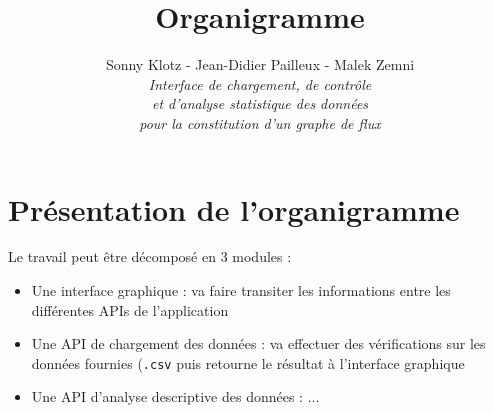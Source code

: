 
\usepackage{tikz}
\usetikzlibrary{arrows,automata}
\usetikzlibrary{positioning}
\geometry{top=3cm,bottom=3cm}

\title{\vspace{\fill}\textbf{\Huge Organigramme}}
\author{Sonny Klotz - Jean-Didier Pailleux - Malek Zemni\vspace{2em}\\\textit{Interface de chargement, de contrôle}\\\textit{et d’analyse statistique des données}\\\textit{pour la constitution d’un graphe de flux}\vspace{2em}}


\maketitle\vspace{\fill}
\newpage
	
	\section{Présentation de l'organigramme}
		Le travail peut être décomposé en 3 modules :
		\begin{itemize}
		\item Une interface graphique : va faire transiter les informations entre les différentes APIs de l'application
		\item Une API de chargement des données : va effectuer des vérifications sur les données fournies (\lstinline!.csv! puis retourne le résultat à l'interface graphique
		\item Une API d'analyse descriptive des données : ...
		\end{itemize}
		
